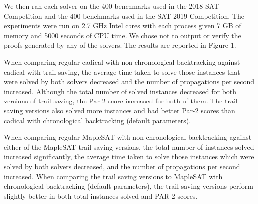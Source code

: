\documentclass{article}
\begin{document}
We then ran each solver on the 400 benchmarks used in the 2018 SAT Competition and the 400 benchmarks used in the SAT 2019 Competition. The experiments were run on 2.7 GHz Intel cores with each process given 7 GB of memory and 5000 seconds of CPU time. We chose not to output or verify the proofs generated by any of the solvers. The results are reported in Figure 1.

When comparing regular cadical with non-chronological backtracking against cadical with trail saving, the average time taken to solve those instances that were solved by both solvers decreased and the number of propagations per second increased. Although the total number of solved instances decreased for both versions of trail saving, the Par-2 score increased for both of them. The trail saving versions also solved more instances and had better Par-2 scores than cadical with chronological backtracking (default parameters).

When comparing regular MapleSAT with non-chronological backtracking against either of the MapleSAT trail saving versions, the total number of instances solved increased significantly, the average time taken to solve those instances which were solved by both solvers decreased, and the number of propagations per second increased. When comparing the trail saving versions to MapleSAT with chronological backtracking (default parameters), the trail saving versions perform slightly better in both total instances solved and PAR-2 scores.
\end{document}
